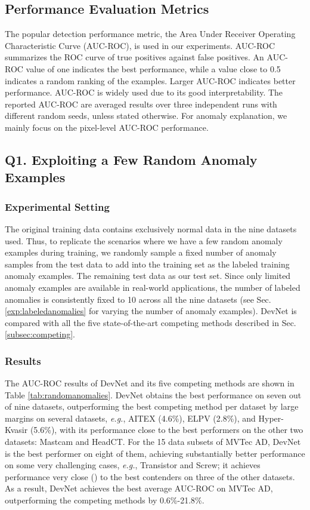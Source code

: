 \documentclass[10pt,journal,compsoc]{IEEEtran}
\newcommand{\eg}{\textit{e.g.}}
\begin{document}
\subsection{Performance Evaluation Metrics}

The popular detection performance metric, the Area Under Receiver Operating Characteristic Curve (AUC-ROC), is used in our experiments. AUC-ROC summarizes the ROC curve of true positives against false positives.
An AUC-ROC value of one indicates the best performance, while a value close to 0.5 indicates a random ranking of the examples. Larger AUC-ROC indicates better performance. AUC-ROC is widely used due to its good interpretability.
The reported AUC-ROC are averaged results over three independent runs with different random seeds, unless stated otherwise. For anomaly explanation, we mainly focus on the pixel-level AUC-ROC performance.

\subsection{Q1. Exploiting a Few Random Anomaly Examples}\label{subsec:random_anomalies}

\subsubsection{Experimental Setting}\label{subsubsec:randomexample}

The original training data contains exclusively normal data in the nine datasets used. Thus, to replicate the scenarios where we have a few random anomaly examples during training, we randomly sample a fixed number of anomaly samples from the test data to add into the training set as the labeled training anomaly examples. The remaining test data as our test set. Since only limited anomaly examples are available in real-world applications, the number of labeled anomalies is consistently fixed to 10 across all the nine datasets (see Sec. \ref{exp:labeledanomalies} for varying the number of anomaly examples). DevNet is compared with all the five state-of-the-art competing methods described in Sec. \ref{subsec:competing}.

\subsubsection{Results}

The AUC-ROC results of DevNet and its five competing methods are shown in Table \ref{tab:randomanomalies}. DevNet obtains the best performance on seven out of nine datasets, outperforming the best competing method per dataset by large margins on several datasets, \eg, AITEX (4.6\%), ELPV (2.8\%), and Hyper-Kvasir (5.6\%), with its performance close to the best performers on the other two datasets: Mastcam and HeadCT. For the 15 data subsets of MVTec AD, DevNet is the best performer on eight of them, achieving substantially better performance on some very challenging cases, \eg, Transistor and Screw; it achieves performance very close () to the best contenders on three of the other datasets. As a result, DevNet achieves the best average AUC-ROC on MVTec AD, outperforming the competing methods by 0.6\%-21.8\%.
\end{document}
